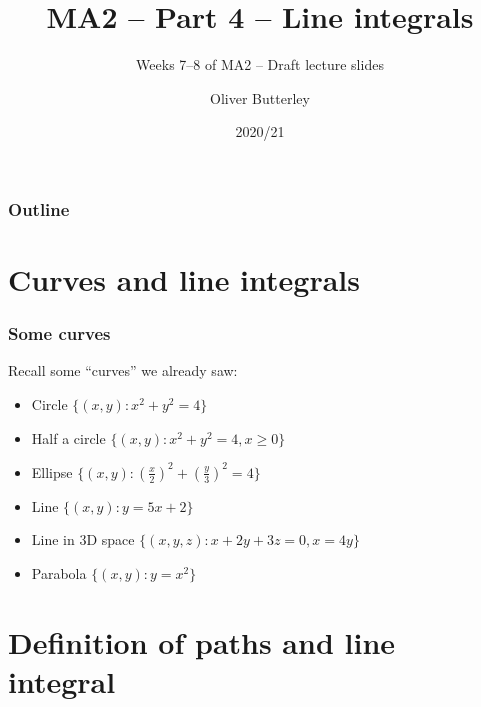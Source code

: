 \documentclass[aspectratio=169,handout]{beamer}
\title{MA2 -- Part 4 -- Line integrals}
\subtitle{Weeks 7--8 of MA2 -- Draft lecture slides}
\author[]{Oliver Butterley}
\institute{University of Rome Tor Vergata}
\date{2020/21}
\begin{document}
\frame{\titlepage}

\begin{frame}
    \frametitle{Outline}
    \tableofcontents
\end{frame}


\section{Curves and line integrals}

\begin{frame}
    \frametitle{Some curves}

    Recall some ``curves'' we already saw:

    \begin{itemize}
        \item Circle \(\{(x,y):x^2+y^2 = 4\}\)
        \item Half a circle \(\{(x,y): x^2+y^2 = 4, x\geq 0\}\)
        \item Ellipse \(\{(x,y): (\frac{x}{2})^2 + (\frac{y}{3})^2 = 4\}\)
        \item Line \(\{(x,y):y=5x+2\}\)
        \item Line in 3D space \(\{(x,y,z):x+2y+3z=0, x=4y\}\)
        \item Parabola \(\{(x,y):y=x^2\}\)
    \end{itemize}



\end{frame}


\section{Definition of paths and line integral}
\end{document}
